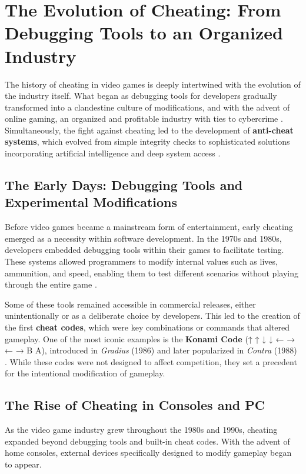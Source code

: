 \chapter{The Evolution of Cheating: From Debugging Tools to an Organized Industry}

The history of cheating in video games is deeply intertwined with the evolution of the industry itself. What began as debugging tools for developers gradually transformed into a clandestine culture of modifications, and with the advent of online gaming, an organized and profitable industry with ties to cybercrime \parencite{consalvo2007cheating}. Simultaneously, the fight against cheating led to the development of \textbf{anti-cheat systems}, which evolved from simple integrity checks to sophisticated solutions incorporating artificial intelligence and deep system access \parencite{yan2005cheats}.

\section{The Early Days: Debugging Tools and Experimental Modifications}

Before video games became a mainstream form of entertainment, early cheating emerged as a necessity within software development. In the 1970s and 1980s, developers embedded debugging tools within their games to facilitate testing. These systems allowed programmers to modify internal values such as lives, ammunition, and speed, enabling them to test different scenarios without playing through the entire game \parencite{smith2018konami}.

Some of these tools remained accessible in commercial releases, either unintentionally or as a deliberate choice by developers. This led to the creation of the first \textbf{cheat codes}, which were key combinations or commands that altered gameplay. One of the most iconic examples is the \textbf{Konami Code} (↑ ↑ ↓ ↓ ← → ← → B A), introduced in \textit{Gradius} (1986) and later popularized in \textit{Contra} (1988) \parencite{kent2001ultimate}. While these codes were not designed to affect competition, they set a precedent for the intentional modification of gameplay.

\section{The Rise of Cheating in Consoles and PC}

As the video game industry grew throughout the 1980s and 1990s, cheating expanded beyond debugging tools and built-in cheat codes. With the advent of home consoles, external devices specifically designed to modify gameplay began to appear.

